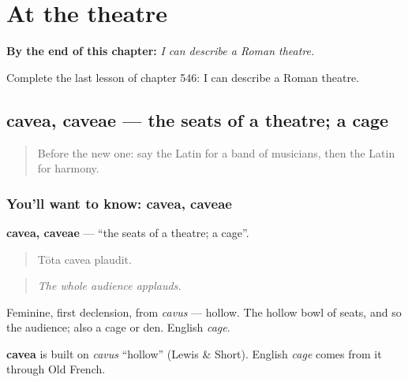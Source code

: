 
\chapter{At the theatre}
\label{ch:la-at-the-theatre}

\begin{chapteropening}
\textbf{By the end of this chapter:} \emph{I can describe a Roman theatre.}

Complete the last lesson of chapter 546: I can describe a Roman theatre.
\end{chapteropening}

\section[cavea, caveae]{cavea, caveae — the seats of a theatre; a cage}

\label{lesson:LA-C546-cavea}



\begin{quote}
Before the new one: say the Latin for a band of musicians, then the Latin for harmony.
\end{quote}

\subsection*{You'll want to know: cavea, caveae}
\textbf{cavea, caveae} — \textquotedblleft{}the seats of a theatre; a cage\textquotedblright{}.

\begin{quote}
Tōta cavea plaudit.
\end{quote}

\begin{quote}
\emph{The whole audience applauds.}
\end{quote}

Feminine, first declension, from \emph{cavus} — hollow. The hollow bowl of seats, and so the audience; also a cage or den. English \emph{cage}.

\begin{cousinweb}
\textbf{cavea} is built on \emph{cavus} \textquotedblleft{}hollow\textquotedblright{} (Lewis \& Short). English \emph{cage} comes from it through Old French.
\end{cousinweb}


